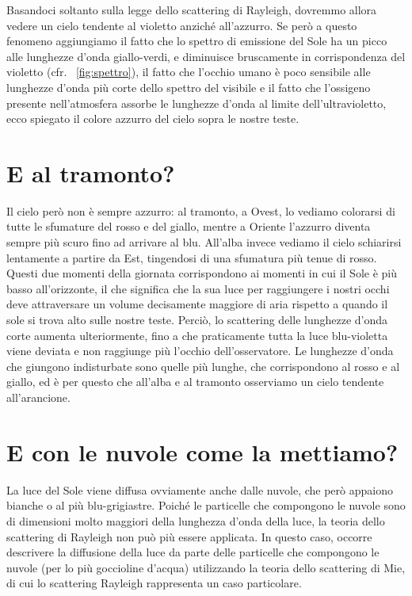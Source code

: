 
Basandoci soltanto sulla legge dello scattering di Rayleigh, dovremmo allora vedere un cielo tendente al violetto anziché all'azzurro.
Se però a questo fenomeno aggiungiamo il fatto che lo spettro di emissione del Sole ha un picco alle lunghezze d'onda giallo-verdi, e diminuisce bruscamente in corrispondenza del violetto (cfr. \figurename~\ref{fig:spettro}), il fatto che l'occhio umano è poco sensibile alle lunghezze d'onda più corte dello spettro del visibile \cite{sensibilita} e il fatto che l'ossigeno presente nell'atmosfera assorbe le lunghezze d'onda al limite dell'ultravioletto, ecco spiegato il colore azzurro del cielo sopra le nostre teste.

\section*{E al tramonto?}
Il cielo però non è sempre azzurro: al tramonto, a Ovest, lo vediamo colorarsi di tutte le sfumature del rosso e del giallo, mentre a Oriente l'azzurro diventa sempre più scuro fino ad arrivare al blu. All'alba invece vediamo il cielo schiarirsi lentamente a partire da Est, tingendosi di una sfumatura più tenue di rosso.
Questi due momenti della giornata corrispondono ai momenti in cui il Sole è più basso all'orizzonte, il che significa che la sua luce per raggiungere i nostri occhi deve attraversare un volume decisamente maggiore di aria rispetto a quando il sole si trova alto sulle nostre teste. Perciò, lo scattering delle lunghezze d'onda corte aumenta ulteriormente, fino a che praticamente tutta la luce blu-violetta viene deviata e non raggiunge più l'occhio dell'osservatore. Le lunghezze d'onda che giungono indisturbate sono quelle più lunghe, che corrispondono al rosso e al giallo, ed è per questo che all'alba e al tramonto osserviamo un cielo tendente all'arancione.

\section*{E con le nuvole come la mettiamo?}
La luce del Sole viene diffusa ovviamente anche dalle nuvole, che però appaiono bianche o al più blu-grigiastre. Poiché le particelle che compongono le nuvole sono di dimensioni molto maggiori della lunghezza d'onda della luce, la teoria dello scattering di Rayleigh non può più essere applicata. In questo caso, occorre descrivere la diffusione della luce da parte delle particelle che compongono le nuvole (per lo più goccioline d'acqua) utilizzando la teoria dello scattering di Mie, di cui lo scattering Rayleigh rappresenta un caso particolare.


